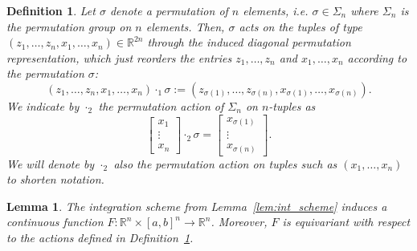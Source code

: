 \documentclass[10pt,a4paper]{amsart}
\newtheorem{lem}{Lemma}
\newtheorem{df}{Definition}
\begin{document}
\begin{df}\label{def:actions}
    {\rm 
Let $\sigma$ denote a permutation of $n$ elements, i.e. $\sigma\in \Sigma_n$ where $\Sigma_n$ is the permutation group on $n$ elements. Then, $\sigma$ acts on the tuples of type $(z_1, \ldots, z_n, x_1, \ldots , x_n)\in \mathbb R^{2n}$ through the induced diagonal permutation representation, which just reorders the entries $z_1, \ldots , z_n$ and $x_1, \ldots , x_n$ according to the permutation $\sigma$: 
            $$(z_1, \ldots, z_n, x_1, \ldots, x_n)\cdot_1 \sigma := (z_{\sigma(1)}, \ldots, z_{\sigma(n)}, x_{\sigma(1)}, \ldots, x_{\sigma(n)}).$$ 
            We indicate by $\cdot_2$ the permutation action of $\Sigma_n$ on $n$-tuples as
            $$
                    \begin{bmatrix}
                                        x_1\\
                                        \vdots\\
                                        x_n
                                 \end{bmatrix}\cdot_2  \sigma = 
                                 \begin{bmatrix}
                                       x_{\sigma(1)}\\
                                       \vdots\\
                                       x_{\sigma(n)}
                                 \end{bmatrix}.
            $$
            We will denote by $\cdot_2$ also the permutation action on tuples such as $(x_1,\ldots, x_n)$ to shorten notation. 
    }
\end{df}

\begin{lem}\label{lem:equiv_gen}
    The integration scheme from Lemma~\ref{lem:int_scheme} induces a continuous function $F: \mathbb R^n\times [a,b]^n \longrightarrow \mathbb R^n$. Moreover, $F$ is equivariant with respect to the actions defined in Definition~\ref{def:actions}.
\end{lem}
\end{document}

